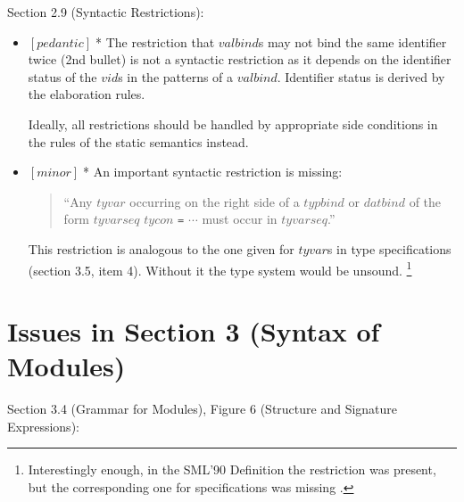 \documentclass{article}
\newcommand{\m}[1]{$[\mathit{#1}]\;$}
\newcommand{\minor}{\m{minor}}
\newcommand{\pedantic}{\m{pedantic}}
\begin{document}
Section 2.9 (Syntactic Restrictions):
\nopagebreak

\begin{itemize}
\item \pedantic * The restriction that $\mathit{valbind}$s may not bind the same identifier twice (2nd bullet) is not a syntactic restriction as it depends on the identifier status of the $\mathit{vid}$s in the patterns of a $\mathit{valbind}$. Identifier status is derived by the elaboration rules.

Ideally, all restrictions should be handled by appropriate side conditions in the rules of the static semantics instead.

\item \minor * An important syntactic restriction is missing:

\begin{quote}
``Any $\mathit{tyvar}$ occurring on the right side of a $\mathit{typbind}$ or $\mathit{datbind}$ of the form $\mathit{tyvarseq}$ $\mathit{tycon}$ {\tt =} $\cdots$ must occur in $\mathit{tyvarseq}$.''
\end{quote}

This restriction is analogous to the one given for $\mathit{tyvar}$s in type specifications (section 3.5, item 4). Without it the type system would be unsound. \footnote{Interestingly enough, in the SML'90 Definition the restriction was present, but the corresponding one for specifications was missing \cite{commentary}.}
\end{itemize}


\section{Issues in Section 3 (Syntax of Modules)}
\label{bugschapter3}

Section 3.4 (Grammar for Modules), Figure 6 (Structure and Signature Expressions):
\nopagebreak
\end{document}
